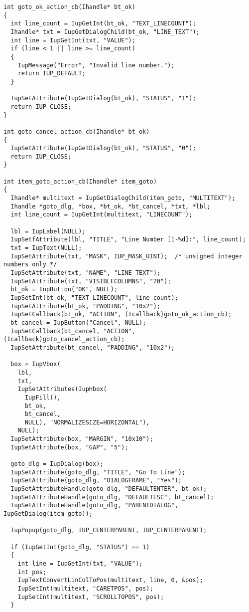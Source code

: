 \documentclass{ctexart}
\begin{document}
\begin{lstlisting}
int goto_ok_action_cb(Ihandle* bt_ok)
{
  int line_count = IupGetInt(bt_ok, "TEXT_LINECOUNT");
  Ihandle* txt = IupGetDialogChild(bt_ok, "LINE_TEXT");
  int line = IupGetInt(txt, "VALUE");
  if (line < 1 || line >= line_count)
  {
    IupMessage("Error", "Invalid line number.");
    return IUP_DEFAULT;
  }

  IupSetAttribute(IupGetDialog(bt_ok), "STATUS", "1");
  return IUP_CLOSE;
}

int goto_cancel_action_cb(Ihandle* bt_ok)
{
  IupSetAttribute(IupGetDialog(bt_ok), "STATUS", "0");
  return IUP_CLOSE;
}

int item_goto_action_cb(Ihandle* item_goto)
{
  Ihandle* multitext = IupGetDialogChild(item_goto, "MULTITEXT");
  Ihandle *goto_dlg, *box, *bt_ok, *bt_cancel, *txt, *lbl;
  int line_count = IupGetInt(multitext, "LINECOUNT");

  lbl = IupLabel(NULL);
  IupSetfAttribute(lbl, "TITLE", "Line Number [1-%d]:", line_count);
  txt = IupText(NULL);
  IupSetAttribute(txt, "MASK", IUP_MASK_UINT);  /* unsigned integer numbers only */
  IupSetAttribute(txt, "NAME", "LINE_TEXT");
  IupSetAttribute(txt, "VISIBLECOLUMNS", "20");
  bt_ok = IupButton("OK", NULL);
  IupSetInt(bt_ok, "TEXT_LINECOUNT", line_count);
  IupSetAttribute(bt_ok, "PADDING", "10x2");
  IupSetCallback(bt_ok, "ACTION", (Icallback)goto_ok_action_cb);
  bt_cancel = IupButton("Cancel", NULL);
  IupSetCallback(bt_cancel, "ACTION", (Icallback)goto_cancel_action_cb);
  IupSetAttribute(bt_cancel, "PADDING", "10x2");

  box = IupVbox(
    lbl,
    txt,
    IupSetAttributes(IupHbox(
      IupFill(),
      bt_ok,
      bt_cancel,
      NULL), "NORMALIZESIZE=HORIZONTAL"),
    NULL);
  IupSetAttribute(box, "MARGIN", "10x10");
  IupSetAttribute(box, "GAP", "5");

  goto_dlg = IupDialog(box);
  IupSetAttribute(goto_dlg, "TITLE", "Go To Line");
  IupSetAttribute(goto_dlg, "DIALOGFRAME", "Yes");
  IupSetAttributeHandle(goto_dlg, "DEFAULTENTER", bt_ok);
  IupSetAttributeHandle(goto_dlg, "DEFAULTESC", bt_cancel);
  IupSetAttributeHandle(goto_dlg, "PARENTDIALOG", IupGetDialog(item_goto));

  IupPopup(goto_dlg, IUP_CENTERPARENT, IUP_CENTERPARENT);

  if (IupGetInt(goto_dlg, "STATUS") == 1)
  {
    int line = IupGetInt(txt, "VALUE");
    int pos;
    IupTextConvertLinColToPos(multitext, line, 0, &pos);
    IupSetInt(multitext, "CARETPOS", pos);
    IupSetInt(multitext, "SCROLLTOPOS", pos);
  }


\end{lstlisting}
\end{document}
